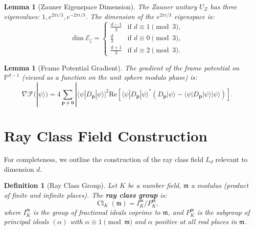\documentclass[a4paper,11pt]{article}
\newtheorem{definition}[theorem]{Definition}
\newtheorem{lemma}[theorem]{Lemma}
\DeclareMathOperator{\Cl}{Cl}
\newcommand{\PP}{\mathbb{P}}
\begin{document}
\begin{lemma}[Zauner Eigenspace Dimension]\label{lem:zauner-dim}
The Zauner unitary $U_Z$ has three eigenvalues: $1, e^{2\pi i/3}, e^{-2\pi i/3}$. The dimension of the $e^{2\pi i/3}$ eigenspace is:
\begin{equation}
\dim \mathcal{E}_\zeta = \begin{cases}
\frac{d-1}{3} & \text{if } d \equiv 1 \pmod{3}, \\
\frac{d}{3} & \text{if } d \equiv 0 \pmod{3}, \\
\frac{d+1}{3} & \text{if } d \equiv 2 \pmod{3}.
\end{cases}
\end{equation}
\end{lemma}

\begin{lemma}[Frame Potential Gradient]\label{lem:gradient}
The gradient of the frame potential on $\PP^{d-1}$ (viewed as a function on the unit sphere modulo phase) is:
\begin{equation}
\nabla \mathcal{F}(|\psi\rangle) = 4\sum_{\mathbf{p} \neq \mathbf{0}} |\langle\psi|D_\mathbf{p}|\psi\rangle|^2 \text{Re}\left[\langle\psi|D_\mathbf{p}|\psi\rangle^* (D_\mathbf{p}|\psi\rangle - \langle\psi|D_\mathbf{p}|\psi\rangle|\psi\rangle)\right].
\end{equation}
\end{lemma}

\section{Ray Class Field Construction}

For completeness, we outline the construction of the ray class field $L_d$ relevant to dimension $d$.

\begin{definition}[Ray Class Group]
Let $K$ be a number field, $\mathfrak{m}$ a modulus (product of finite and infinite places). The \textbf{ray class group} is:
\begin{equation}
\Cl_K(\mathfrak{m}) = I_K^{\mathfrak{m}} / P_K^{\mathfrak{m}},
\end{equation}
where $I_K^{\mathfrak{m}}$ is the group of fractional ideals coprime to $\mathfrak{m}$, and $P_K^{\mathfrak{m}}$ is the subgroup of principal ideals $(\alpha)$ with $\alpha \equiv 1 \pmod{\mathfrak{m}}$ and $\alpha$ positive at all real places in $\mathfrak{m}$.
\end{definition}
\end{document}
